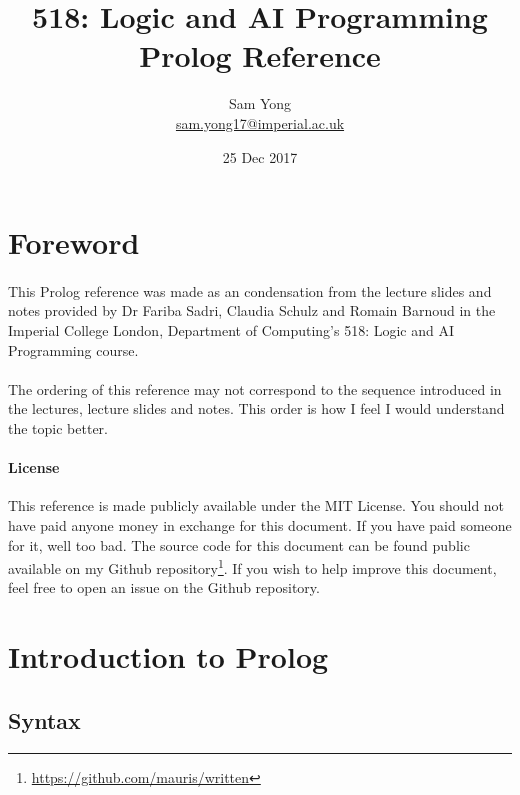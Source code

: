 \documentclass{article}
\title{
	 \large 518: Logic and AI Programming \\
	 \huge Prolog Reference
}
\date{25 Dec 2017}
\author{
	Sam Yong \\
	\small \href{mailto:sam.yong17@imperial.ac.uk}{sam.yong17@imperial.ac.uk}
}
\begin{document}
  \maketitle
  
  \begin{multicols}{2}
  
  \section*{Foreword}  
  
  \paragraph{} This Prolog reference was made as an condensation from the lecture slides and notes provided by Dr Fariba Sadri, Claudia Schulz and Romain Barnoud in the Imperial College London, Department of Computing's 518: Logic and AI Programming course.
  
  \paragraph{} The ordering of this reference may not correspond to the sequence introduced in the lectures, lecture slides and notes. This order is how I feel I would understand the topic better.
  
  \begin{footnotesize}
  \paragraph{License} This reference is made publicly available under the MIT License. You should not have paid anyone money in exchange for this document. If you have paid someone for it, well too bad. The source code for this document can be found public available on my Github repository\footnote{\href{https://github.com/mauris/written}{https://github.com/mauris/written}}. If you wish to help improve this document, feel free to open an issue on the Github repository.
  \end{footnotesize}
  
  \tableofcontents
  
  \newpage
  
  \section{Introduction to Prolog}
  
  \subsection{Syntax}
  

\end{multicols}
\end{document}
